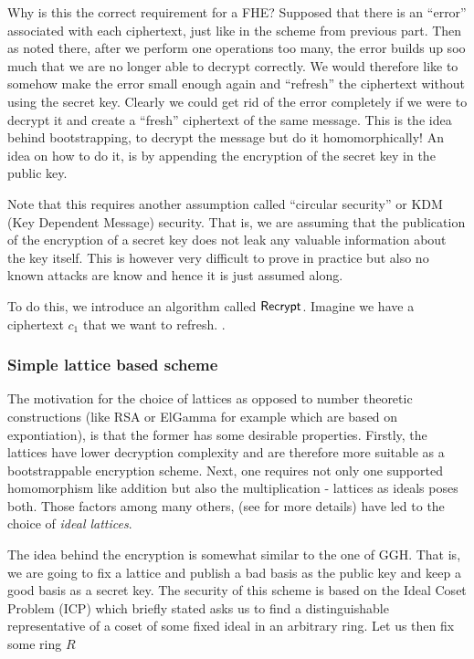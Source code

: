 Why is this the correct requirement for a FHE? Supposed that there is an ``error'' associated with each ciphertext, just like in the scheme from previous part. Then as noted there, after we perform one operations too many, the error builds up soo much that we are no longer able to decrypt correctly. We would therefore like to somehow make the error small enough again and ``refresh'' the ciphertext without using the secret key. Clearly we could get rid of the error completely if we were to decrypt it and create a ``fresh'' ciphertext of the same message. This is the idea behind bootstrapping, to decrypt the message but do it homomorphically! An idea on how to do it, is by appending the encryption of the secret key in the public key.

\begin{remark}
Note that this requires another assumption called ``circular security'' or KDM (Key Dependent Message) security. That is, we are assuming that the publication of the encryption of a secret key does not leak any valuable information about the key itself. This is however very difficult to prove in practice but also no known attacks are know and hence it is just assumed along.
\end{remark}

To do this, we introduce an algorithm called $\alg{Recrypt}$. Imagine we have a ciphertext $c_1$ that we want to refresh. .

\subsubsection{Simple lattice based scheme}
The motivation for the choice of lattices as opposed to number theoretic constructions (like RSA or ElGamma for example which are based on expontiation), is that the former has some desirable properties. Firstly, the lattices have lower decryption complexity and are therefore more suitable as a bootstrappable encryption scheme. Next, one requires not only one supported homomorphism like addition but also the multiplication - lattices as ideals poses both. Those factors among many others, (see \cite{gentry} for more details) have led to the choice of \textit{ideal lattices}.

The idea behind the encryption is somewhat similar to the one of GGH. That is, we are going to fix a lattice and publish a bad basis as the public key and keep a good basis as a secret key. The security of this scheme is based on the Ideal Coset Problem (ICP) which briefly stated asks us to find a distinguishable representative of a coset of some fixed ideal in an arbitrary ring. Let us then fix some ring $R$

